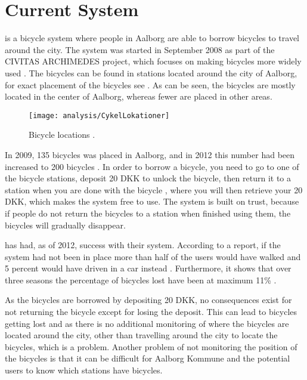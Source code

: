 \section{Current System}\label{sec:currentsystem}


\bycykel is a bicycle system where people in Aalborg are able to borrow bicycles to travel around the city.
The system was started in September 2008 as part of the CIVITAS ARCHIMEDES project, which focuses on making bicycles more widely used \citep{misc:aalborgcykling}.
The bicycles can be found in stations located around the city of Aalborg, for exact placement of the bicycles see .
As can be seen, the bicycles are mostly located in the center of Aalborg, whereas fewer are placed in other areas.

\begin{figure}[h]
	\centering
	\texttt{[image: analysis/CykelLokationer]}
	\caption{Bicycle locations \citep{misc:aalborgbycykel}.}
	\label{fig:CykelLokationer}
\end{figure}

In 2009, 135 bicycles was placed in Aalborg, and in 2012 this number had been increased to 200 bicycles \citep{misc:aalborgcykling}.
In order to borrow a bicycle, you need to go to one of the bicycle stations, deposit 20 DKK to unlock the bicycle, then return it to a station when you are done with the bicycle \citep{misc:aalborgbycykelregler}, where you will then retrieve your 20 DKK, which makes the system free to use.
The system is built on trust, because if people do not return the bicycles to a station when finished using them, the bicycles will gradually disappear.

\bycykel has had, as of 2012, success with their system. 
According to a report, if the system had not been in place more than half of the users would have walked and 5 percent would have driven in a car instead \citep{misc:aalborgcykling}.
Furthermore, it shows that over three seasons the percentage of bicycles lost have been at maximum 11\% \citep{misc:aalborgcykling}.

As the bicycles are borrowed by depositing 20 DKK, no consequences exist for not returning the bicycle except for losing the deposit.
This can lead to bicycles getting lost and as there is no additional monitoring of where the bicycles are located around the city, other than travelling around the city to locate the bicycles, which is a problem.
Another problem of not monitoring the position of the bicycles is that it can be difficult for Aalborg Kommune and the potential users to know which stations have bicycles.

